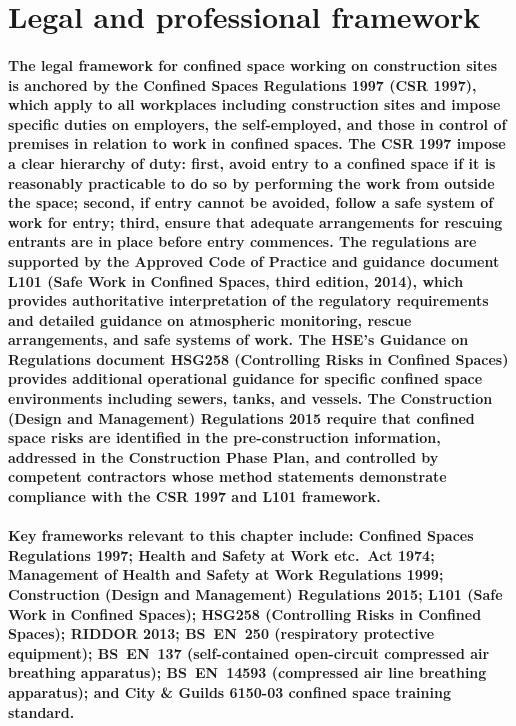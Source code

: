 \section{Legal and professional framework}

\paragraph{The legal framework for confined space working on construction sites is anchored by the Confined Spaces Regulations 1997 (CSR 1997), which apply to all workplaces including construction sites and impose specific duties on employers, the self-employed, and those in control of premises in relation to work in confined spaces. The CSR 1997 impose a clear hierarchy of duty: first, avoid entry to a confined space if it is reasonably practicable to do so by performing the work from outside the space; second, if entry cannot be avoided, follow a safe system of work for entry; third, ensure that adequate arrangements for rescuing entrants are in place before entry commences. The regulations are supported by the Approved Code of Practice and guidance document L101 (Safe Work in Confined Spaces, third edition, 2014), which provides authoritative interpretation of the regulatory requirements and detailed guidance on atmospheric monitoring, rescue arrangements, and safe systems of work. The HSE's Guidance on Regulations document HSG258 (Controlling Risks in Confined Spaces) provides additional operational guidance for specific confined space environments including sewers, tanks, and vessels. The Construction (Design and Management) Regulations 2015 require that confined space risks are identified in the pre-construction information, addressed in the Construction Phase Plan, and controlled by competent contractors whose method statements demonstrate compliance with the CSR 1997 and L101 framework.}

\paragraph{Key frameworks relevant to this chapter include: Confined Spaces Regulations 1997; Health and Safety at Work etc.\ Act 1974; Management of Health and Safety at Work Regulations 1999; Construction (Design and Management) Regulations 2015; L101 (Safe Work in Confined Spaces); HSG258 (Controlling Risks in Confined Spaces); RIDDOR 2013; BS~EN~250 (respiratory protective equipment); BS~EN~137 (self-contained open-circuit compressed air breathing apparatus); BS~EN~14593 (compressed air line breathing apparatus); and City \& Guilds 6150-03 confined space training standard.}

